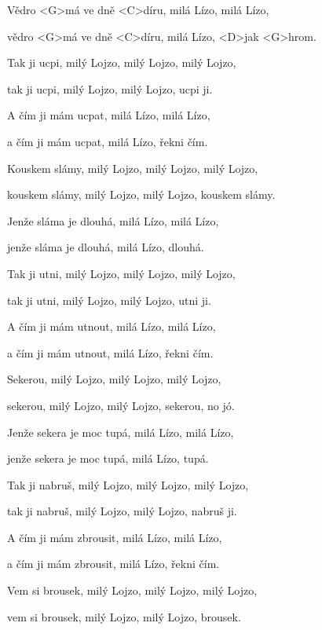 







\zs
Vědro <G>má ve dně <C>díru, milá Lízo, milá Lízo,

vědro <G>má ve dně <C>díru, milá Lízo, <D>jak <G>hrom.
\ks

\zs
Tak ji ucpi, milý Lojzo, milý Lojzo, milý Lojzo,

tak ji ucpi, milý Lojzo, milý Lojzo, ucpi ji.
\ks

\zs
A čím ji mám ucpat, milá Lízo, milá Lízo,

a čím ji mám ucpat, milá Lízo, řekni čím.
\ks

\zs
Kouskem slámy, milý Lojzo, milý Lojzo, milý Lojzo,

kouskem slámy, milý Lojzo, milý Lojzo, kouskem slámy.
\ks

\zs
Jenže sláma je dlouhá, milá Lízo, milá Lízo,

jenže sláma je dlouhá, milá Lízo, dlouhá.
\ks

\zs
Tak ji utni, milý Lojzo, milý Lojzo, milý Lojzo,

tak ji utni, milý Lojzo, milý Lojzo, utni ji.
\ks

\zs
A čím ji mám utnout, milá Lízo, milá Lízo,

a čím ji mám utnout, milá Lízo, řekni čím.
\ks

\zs
Sekerou, milý Lojzo, milý Lojzo, milý Lojzo,

sekerou, milý Lojzo, milý Lojzo, sekerou, no jó.
\ks

\zs
Jenže sekera je moc tupá, milá Lízo, milá Lízo,

jenže sekera je moc tupá, milá Lízo, tupá.
\ks

\zs
Tak ji nabruš, milý Lojzo, milý Lojzo, milý Lojzo,

tak ji nabruš, milý Lojzo, milý Lojzo, nabruš ji.
\ks

\zs
A čím ji mám zbrousit, milá Lízo, milá Lízo,

a čím ji mám zbrousit, milá Lízo, řekni čím.
\ks

\zs
Vem si brousek, milý Lojzo, milý Lojzo, milý Lojzo,

vem si brousek, milý Lojzo, milý Lojzo, brousek.
\ks

